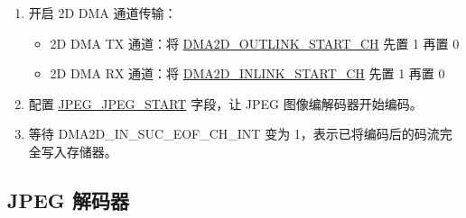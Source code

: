 \documentclass[main\_\_CN.tex]{subfiles}
\begin{document}
\begin{enumerate}
\begin{itemize}
    \end{itemize}
    \item 开启 2D DMA 通道传输：
    \begin{itemize}
        \item 2D DMA TX 通道：将 \hyperref[fielddesc:DMA2DOUTLINKSTARTCHN]{DMA2D\_OUTLINK\_START\_CH} 先置 1 再置 0
        \item 2D DMA RX 通道：将 \hyperref[fielddesc:DMA2DINLINKSTARTCHN]{DMA2D\_INLINK\_START\_CH} 先置 1 再置 0
    \end{itemize}
    \item 配置 \hyperref[fielddesc:JPEGJPEGSTART]{JPEG\_JPEG\_START} 字段，让 JPEG 图像编解码器开始编码。
    \item 等待 DMA2D\_IN\_SUC\_EOF\_CH\_INT 变为 1，表示已将编码后的码流完全写入存储器。
\end{enumerate}


\subsection{JPEG 解码器}
\label{sec:jpegcodec-dec-prog}
\end{document}
